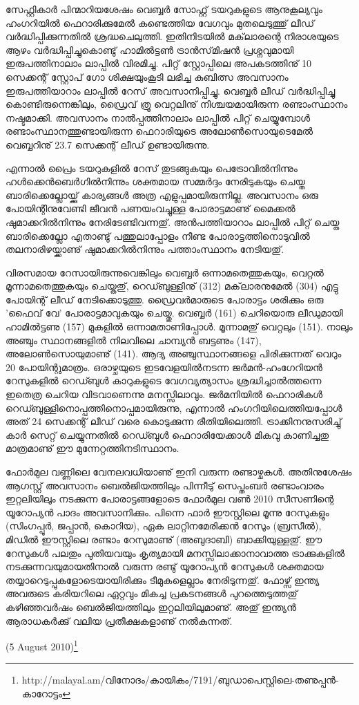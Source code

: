 സേഫ്റ്റികാര്‍ പിന്മാറിയശേഷം വെബ്ബര്‍ സോഫ്റ്റ് ടയറുകളുടെ ആനുകൂല്യവും ഹംഗറിയില്‍ ഫെറാരിക്കുമേല്‍ കണ്ടെത്തിയ 
വേഗവും മുതലെടുത്തു് ലീഡ് വര്‍ദ്ധിപ്പിക്കുന്നതില്‍ ശ്രദ്ധചെലുത്തി. ഇതിനിടയില്‍ മക്‌ലാരന്റെ നിരാശയുടെ ആഴം 
വര്‍ദ്ധിപ്പിച്ചുകൊണ്ടു് ഹാമില്‍ട്ടണ്‍ ട്രാന്‍സ്‌മിഷന്‍ പ്രശ്നവുമായി ഇരുപത്തിനാലാം ലാപ്പില്‍ വിരമിച്ചു. പിറ്റ് സ്റ്റോപ്പിലെ 
അപകടത്തിനു് 10 സെക്കന്റ് സ്റ്റോപ് ഗോ ശിക്ഷയുംകൂടി ലഭിച്ച കുബിത്സ അവസാനം ഇരുപത്തിയാറാം ലാപ്പില്‍ 
റേസ് അവസാനിപ്പിച്ചു. വെബ്ബര്‍ ലീഡ് വര്‍ദ്ധിപ്പിച്ചു കൊണ്ടിരുന്നെങ്കിലും, ഡ്രൈവ് ത്രൂ വെറ്റലിനു്
നിശ്ചയമായിരുന്ന രണ്ടാംസ്ഥാനം നഷ്ടമാക്കി. അവസാനം നാല്‍പ്പത്തിനാലാം ലാപ്പില്‍ പിറ്റ് ചെയ്യുമ്പോള്‍ രണ്ടാംസ്ഥാനത്തുണ്ടായിരുന്ന 
ഫെറാരിയുടെ അലോണ്‍സൊയുടെമേല്‍ വെബ്ബറിനു് 23.7 സെക്കന്റ് ലീഡ് ഉണ്ടായിരുന്നു.

എന്നാല്‍ പ്രൈം ടയറുകളില്‍ റേസ് തുടങ്ങുകയും പെട്രോവില്‍നിന്നും ഹള്‍ക്കെന്‍ബെര്‍ഗില്‍നിന്നും ശക്തമായ സമ്മര്‍ദ്ദം 
നേരിടുകയും ചെയ്ത ബാരിക്കെല്ലോയ്ക്കു് കാര്യങ്ങള്‍ അത്ര എളുപ്പമായിരുന്നില്ല. അവസാനം ഒരു പോയിന്റിനുവേണ്ടി ജീവന്‍ 
പണയംവച്ചുള്ള പോരാട്ടമാണു് മൈക്കല്‍ ഷുമാക്കറില്‍നിന്നും നേരിടേണ്ടിവന്നതു്. അന്‍പത്തിയാറാം ലാപ്പില്‍ പിറ്റ് 
ചെയ്ത ബാരിക്കെല്ലോ എതാണ്ടു് പത്തുലാപ്പോളം നീണ്ട പോരാട്ടത്തിനൊടുവില്‍ തലനാരിഴയ്ക്കാണു് ഷുമാക്കറില്‍നിന്നും 
പത്താംസ്ഥാനം നേടിയതു്.

വിരസമായ റേസായിരുന്നുവെങ്കിലും വെബ്ബര്‍ ഒന്നാമതെത്തുകയും, വെറ്റല്‍ മൂന്നാമതെത്തുകയും ചെയ്തതു്, റെഡ്ബുള്ളിനു് 
(312) മക്‌ലാരനുമേല്‍ (304) എട്ടു പോയിന്റ് ലീഡ് നേടിക്കൊടുത്തു. ഡ്രൈവര്‍മാരുടെ പോരാട്ടം ശരിക്കും ഒരു 'ഫൈവ് 
വേ' പോരാട്ടമാവുകയും ചെയ്തു. വെബ്ബര്‍ (161) ചെറിയൊരു ലീഡുമായി ഹാമില്‍ട്ടണു (157) മുകളില്‍ ഒന്നാമതാണിപ്പോള്‍. 
മൂന്നാമതു് വെറ്റലും (151). നാലും അഞ്ചും സ്ഥാനങ്ങളില്‍ നിലവിലെ ചാമ്പ്യന്‍ ബട്ടണും (147), 
അലോണ്‍സൊയുമാണു് (141). ആദ്യ അഞ്ചുസ്ഥാനങ്ങളെ പിരിക്കുന്നത് വെറും 20 പോയിന്റുമാത്രം. ഒരാഴ്ചയുടെ 
ഇടവേളയില്‍നടന്ന ജര്‍മന്‍-ഹംഗേറിയന്‍ റേസുകളില്‍ റെഡ്ബുള്‍ കാറുകളുടെ വേഗവ്യത്യാസം ശ്രദ്ധിച്ചാല്‍ത്തന്നെ 
ഇതെത്ര ചെറിയ വിടവാണെന്നു മനസ്സിലാവും. ജര്‍മനിയില്‍ ഫെറാരികള്‍ റെഡ്ബുള്ളിനൊപ്പത്തിനൊപ്പമായിരുന്നു, 
എന്നാല്‍ ഹംഗറിയിലെത്തിയപ്പോള്‍ അത് 24 സെക്കന്റ് ലീഡ് വരെ കൊടുക്കുന്ന രീതിയിലെത്തി. ട്രാക്കിനനുസരിച്ചു് 
കാര്‍ സെറ്റ് ചെയ്യുന്നതില്‍ റെഡ്ബുള്‍ ഫെറാരിയേക്കാള്‍ മികവു കാണിച്ചതു മാത്രമാണു് ഈ മുന്നേറ്റത്തിനടിസ്ഥാനം.

ഫോര്‍മുല വണ്ണിലെ വേനലവധിയാണു് ഇനി വരുന്ന രണ്ടാഴ്ചകള്‍. അതിനുശേഷം ആഗസ്റ്റ് അവസാനം 
ബെല്‍ജിയത്തിലും പിന്നീടു് സെപ്തംബര്‍ രണ്ടാംവാരം ഇറ്റലിയിലും നടക്കുന്ന പോരാട്ടങ്ങളോടെ ഫോര്‍മുല വണ്‍ 2010 
സീസണിന്റെ യൂറോപ്യന്‍ പാദം അവസാനിക്കും. പിന്നെ ഫാര്‍ ഈസ്റ്റിലെ മൂന്നു റേസുകളും (സിംഗപ്പൂര്‍, ജപ്പാന്‍, കൊറിയ),
ഏക ലാറ്റിനമേരിക്കന്‍ റേസും (ബ്രസീല്‍), മിഡില്‍ ഈസ്റ്റിലെ രണ്ടാം റേസുമാണു് (അബുദാബി) ബാക്കിയുള്ളതു്. ഈ 
റേസുകള്‍ പലതും പുതിയവയും കൃത്യമായി മനസ്സിലാക്കാനാവാത്ത ട്രാക്കുകളില്‍ നടക്കുന്നവയുമായതിനാല്‍ വരുന്ന രണ്ടു് 
യൂറോപ്യന്‍ റേസുകള്‍ ശക്തമായ തയ്യാറെടുപ്പുകളോടെയായിരിക്കും ടീമുകളെല്ലാം നേരിടുന്നതു്. ഫോഴ്സ് ഇന്ത്യ അവരുടെ 
കരിയറിലെ ഏറ്റവും മികച്ച പ്രകടനങ്ങള്‍ പുറത്തെടുത്തതു് കഴിഞ്ഞവര്‍ഷം ബെല്‍ജിയത്തിലും ഇറ്റലിയിലുമാണു്. 
അതു് ഇന്ത്യന്‍ ആരാധകര്‍ക്കു് വലിയ പ്രതീക്ഷകളാണു് നല്‍കുന്നത്.

(5 August 2010)\footnote{http://malayal.am/വിനോദം/കായികം/7191/ബുഡാപെസ്റ്റിലെ-തണുപ്പന്‍-കാറോട്ടം}

\newpage
